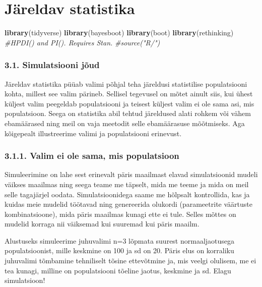 \documentclass[]{book}
\newenvironment{Shaded}{\begin{snugshade}}{\end{snugshade}}
\newcommand{\KeywordTok}[1]{\textcolor[rgb]{0.13,0.29,0.53}{\textbf{#1}}}
\newcommand{\CommentTok}[1]{\textcolor[rgb]{0.56,0.35,0.01}{\textit{#1}}}
\newcommand{\NormalTok}[1]{#1}
\begin{document}
\chapter{Järeldav statistika}\label{jareldav-statistika}

\begin{Shaded}
\begin{Highlighting}[]
\KeywordTok{library}\NormalTok{(tidyverse)}
\KeywordTok{library}\NormalTok{(bayesboot)}
\KeywordTok{library}\NormalTok{(boot)}
\KeywordTok{library}\NormalTok{(rethinking) }\CommentTok{#HPDI() and PI(). Requires Stan.}
\CommentTok{#source("R/")}
\end{Highlighting}
\end{Shaded}

\subsection{3.1. Simulatsiooni jõud}\label{simulatsiooni-joud}

Järeldav statistika püüab valimi põhjal teha järeldusi statistilise
populatsiooni kohta, millest see valim pärineb. Sellisel tegevusel on
mõtet ainult siis, kui ühest küljest valim peegeldab populatsiooni ja
teisest küljest valim ei ole sama asi, mis populatsioon. Seega on
statistika abil tehtud järeldused alati rohkem või vähem ebamäärased
ning meil on vaja meetodit selle ebamäärasuse mõõtmiseks. Aga kõigepealt
illustreerime valimi ja populatsiooni erinevust.

\subsection{3.1.1. Valim ei ole sama, mis
populatsioon}\label{valim-ei-ole-sama-mis-populatsioon}

Simuleerimine on lahe sest erinevalt päris maailmast elavad
simulatsioonid mudeli väikses maailmas ning seega teame me täpselt, mida
me teeme ja mida on meil selle tagajärjel oodata. Simulatsioonidega
saame me hõlpsalt kontrollida, kas ja kuidas meie mudelid töötavad ning
genereerida olukordi (parameetrite väärtuste kombinatsioone), mida päris
maailmas kunagi ette ei tule. Selles mõttes on mudelid korraga nii
väiksemad kui suuremad kui päris maailm.

Alustuseks simuleerime juhuvalimi n=3 lõpmata suurest normaaljaotusega
populatsioonist, mille keskmine on 100 ja sd on 20. Päris elus on
korraliku juhuvalimi tõmbamine tehniliselt tõsine ettevõtmine ja, mis
veelgi olulisem, me ei tea kunagi, milline on populatsiooni tõeline
jaotus, keskmine ja sd. Elagu simulatsioon!
\end{document}
